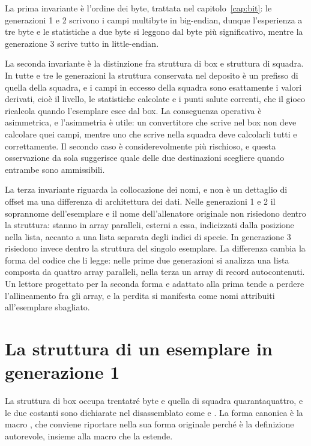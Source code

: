 La prima invariante è l'ordine dei byte, trattata nel capitolo~\ref{cap:bit}: le generazioni 1 e 2 scrivono i campi multibyte in big-endian, dunque l'esperienza a tre byte e le statistiche a due byte si leggono dal byte più significativo, mentre la generazione 3 scrive tutto in little-endian.

La seconda invariante è la distinzione fra struttura di box e struttura di squadra. In tutte e tre le generazioni la struttura conservata nel deposito è un prefisso di quella della squadra, e i campi in eccesso della squadra sono esattamente i valori derivati, cioè il livello, le statistiche calcolate e i punti salute correnti, che il gioco ricalcola quando l'esemplare esce dal box. La conseguenza operativa è asimmetrica, e l'asimmetria è utile: un convertitore che scrive nel box non deve calcolare quei campi, mentre uno che scrive nella squadra deve calcolarli tutti e correttamente. Il secondo caso è considerevolmente più rischioso, e questa osservazione da sola suggerisce quale delle due destinazioni scegliere quando entrambe sono ammissibili.

La terza invariante riguarda la collocazione dei nomi, e non è un dettaglio di offset ma una differenza di architettura dei dati. Nelle generazioni 1 e 2 il soprannome dell'esemplare e il nome dell'allenatore originale non risiedono dentro la struttura: stanno in array paralleli, esterni a essa, indicizzati dalla posizione nella lista, accanto a una lista separata degli indici di specie. In generazione 3 risiedono invece dentro la struttura del singolo esemplare. La differenza cambia la forma del codice che li legge: nelle prime due generazioni si analizza una lista composta da quattro array paralleli, nella terza un array di record autocontenuti. Un lettore progettato per la seconda forma e adattato alla prima tende a perdere l'allineamento fra gli array, e la perdita si manifesta come nomi attribuiti all'esemplare sbagliato.

\section{La struttura di un esemplare in generazione 1}

La struttura di box occupa trentatré byte e quella di squadra quarantaquattro, e le due costanti sono dichiarate nel disassemblato come  e  \cite{pokered}. La forma canonica è la macro , che conviene riportare nella sua forma originale perché è la definizione autorevole, insieme alla macro  che la estende.

